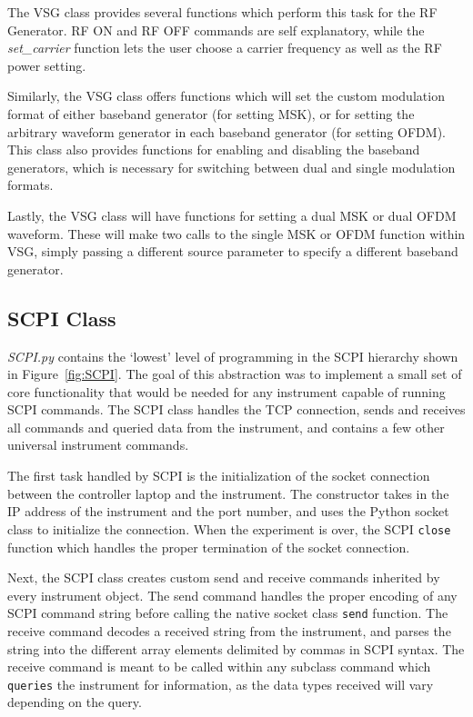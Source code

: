 The VSG class provides several functions which perform this task for the RF Generator. RF ON and RF OFF commands are self explanatory, while the \textit{set\_carrier} function lets the user choose a carrier frequency as well as the RF power setting.

Similarly, the VSG class offers functions which will set the custom modulation format of either baseband generator (for setting MSK), or for setting the arbitrary waveform generator in each baseband generator (for setting OFDM). This class also provides functions for enabling and disabling the baseband generators, which is necessary for switching between dual and single modulation formats. 

Lastly, the VSG class will have functions for setting a dual MSK or dual OFDM waveform. These will make two calls to the single MSK or OFDM function within VSG, simply passing a different source parameter to specify a different baseband generator.  

\subsection{SCPI Class}
\textit{SCPI.py} contains the `lowest' level of programming in the SCPI hierarchy shown in Figure~\ref{fig:SCPI}. The goal of this abstraction was to implement a small set of core functionality that would be needed for any instrument capable of running SCPI commands. The SCPI class handles the TCP connection, sends and receives all commands and queried data from the instrument, and contains a few other universal instrument commands. 

The first task handled by SCPI is the initialization of the socket connection between the controller laptop and the instrument. The constructor takes in the IP address of the instrument and the port number, and uses the Python socket class to initialize the connection. When the experiment is over, the SCPI \texttt{close} function which handles the proper termination of the socket connection. 

Next, the SCPI class creates custom send and receive commands inherited by every instrument object. The send command handles the proper encoding of any SCPI command string before calling the native socket class \texttt{send} function. The receive command decodes a received string from the instrument, and parses the string into the different array elements delimited by commas in SCPI syntax. The receive command is meant to be called within any subclass command which \texttt{queries} the instrument for information, as the data types received will vary depending on the query. 

